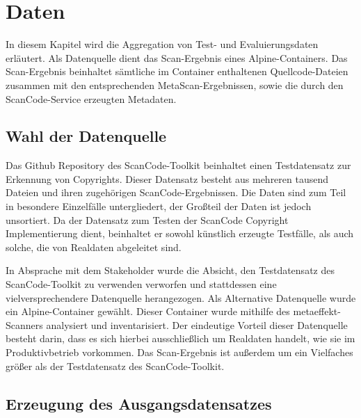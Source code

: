 \chapter{Daten}\label{ch:daten}

In diesem Kapitel wird die Aggregation von Test- und Evaluierungsdaten erläutert.
Als Datenquelle dient das Scan-Ergebnis eines Alpine-Containers.
Das Scan-Ergebnis beinhaltet sämtliche im Container enthaltenen Quellcode-Dateien zusammen mit den entsprechenden MetaScan-Ergebnissen, sowie die durch den ScanCode-Service erzeugten Metadaten.


\section{Wahl der Datenquelle}\label{sec:wahl-der-datenquelle}

Das Github Repository des ScanCode-Toolkit beinhaltet einen Testdatensatz zur Erkennung von Copyrights.
Dieser Datensatz besteht aus mehreren tausend Dateien und ihren zugehörigen ScanCode-Ergebnissen.
Die Daten sind zum Teil in besondere Einzelfälle untergliedert, der Großteil der Daten ist jedoch unsortiert.
Da der Datensatz zum Testen der ScanCode Copyright Implementierung dient, beinhaltet er sowohl künstlich erzeugte Testfälle, als auch solche, die von Realdaten abgeleitet sind.

In Absprache mit dem Stakeholder wurde die Absicht, den Testdatensatz des ScanCode-Toolkit zu verwenden verworfen und stattdessen eine vielversprechendere Datenquelle herangezogen.
Als Alternative Datenquelle wurde ein Alpine-Container gewählt.
Dieser Container wurde mithilfe des metaeffekt-Scanners analysiert und inventarisiert.
Der eindeutige Vorteil dieser Datenquelle besteht darin, dass es sich hierbei ausschließlich um Realdaten handelt, wie sie im Produktivbetrieb vorkommen.
Das Scan-Ergebnis ist außerdem um ein Vielfaches größer als der Testdatensatz des ScanCode-Toolkit.


\section{Erzeugung des Ausgangsdatensatzes}\label{sec:erzeugung-datensatz}

